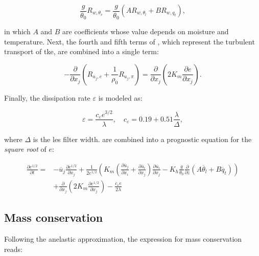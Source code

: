 \begin{equation}
    \frac{g}{\theta_0} R_{w,\theta_v} = \frac{g}{\theta_0} \left( A R_{w,\theta_l} + B R_{w,q_t}\right),
    \label{eq:sfs_buoy}
\end{equation}

in which $A$ and $B$ are coefficients whose value depends on moisture and temperature. Next, the fourth and fifth terms of , which represent the turbulent transport of \acrshort{tke}, are combined into a single term:

\begin{equation}
    - \frac{\partial}{\partial x_j} \left( R_{u_j,e} + \frac{1}{\rho_0} R_{u_j,\pi} \right) = \frac{\partial}{\partial x_j} \left( 2 K_m \frac{\partial e}{\partial x_j} \right).
    \label{eq:sfs_turb}
\end{equation}

Finally, the dissipation rate $\varepsilon$ is modeled as:

\begin{equation}
    \varepsilon = \frac{c_{\varepsilon}e^{3/2}}{\lambda}, \quad c_\varepsilon = 0.19 + 0.51 \frac{\lambda}{\Delta},
    \label{eq:sfs_diss}
\end{equation}

where $\Delta$ is the \acrshort{les} filter width.  are combined into a prognostic equation for the \emph{square root} of $e$:

\begin{equation}
    \begin{split}
        \frac{\partial e^{1/2}}{\partial t} = &- \overline{u}_j \frac{\partial e^{1/2}}{\partial x_j} + \frac{1}{2e^{1/2}} \left( K_m \left( \frac{\partial \overline{u}_j}{\partial x_i} + \frac{\partial \overline{u}_i}{\partial x_j} \right) \frac{\partial \overline{u}_i}{\partial x_j} - K_h \frac{g}{\theta_0} \frac{\partial}{\partial z} \left( A \overline{\theta}_l + B \overline{q}_t\right) \right) \\ &+ \frac{\partial}{\partial x_j} \left( 2 K_m \frac{\partial e^{1/2}}{\partial x_j}\right) - \frac{c_{\varepsilon} e}{2 \lambda}
    \end{split}
    \end{equation}

\subsection{Mass conservation} \label{sec:dales_poisson}
Following the anelastic approximation, the expression for mass conservation reads:

